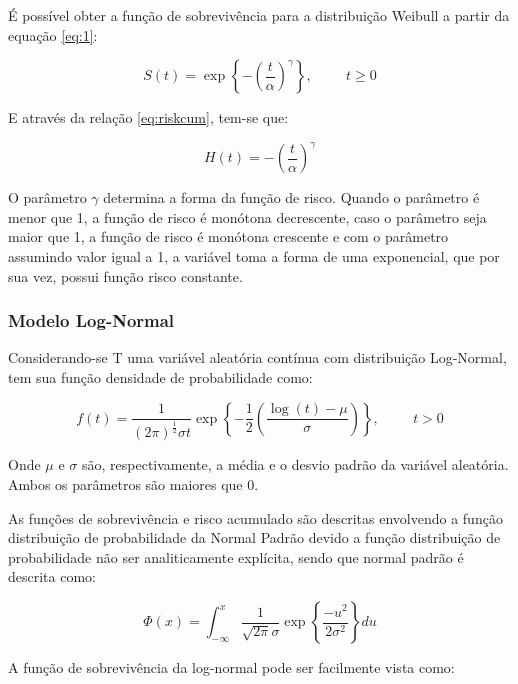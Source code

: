 \documentclass[a4paper,12pt]{article}
\begin{document}
É possível obter a função de sobrevivência para a distribuição Weibull a partir da equação \ref{eq:1}:

\begin{equation} \label{eq:WeiHaz}
S(t) = \exp \left\lbrace - \left( \dfrac{t}{\alpha} \right)^{\gamma} \right\rbrace, \hspace{1cm} t \ge 0
\end{equation}

E através da relação \ref{eq:riskcum}, tem-se que:

\begin{equation} \label{eq:WeRis}
	H(t) = - \left( \dfrac{t}{\alpha} \right)^{\gamma}
\end{equation}

O parâmetro $\gamma$ determina a forma da função de risco. Quando o parâmetro é menor que 1, a função de risco é monótona decrescente, caso o parâmetro seja maior que 1, a função de risco é monótona crescente e com o parâmetro assumindo valor igual a 1, a variável toma a forma de uma exponencial, que por sua vez, possui função risco constante.

\subsubsection{Modelo Log-Normal}

Considerando-se T uma variável aleatória contínua com distribuição Log-Normal, tem sua função densidade de probabilidade como:

\begin{equation}
 f(t) = \dfrac{1}{(2\pi)^{\frac{1}{2}}\sigma t}\exp\left\lbrace -\dfrac{1}{2} \left( \dfrac{\log(t) - \mu}{\sigma} \right) \right\rbrace, \hspace{1cm} t > 0
\end{equation}

Onde $\mu$ e $\sigma$ são, respectivamente, a média e o desvio padrão da variável aleatória. Ambos os parâmetros são maiores que 0.

As funções de sobrevivência e risco acumulado são descritas envolvendo a função distribuição de probabilidade da Normal Padrão devido a função distribuição de probabilidade não ser analiticamente explícita, sendo que normal padrão é descrita como:

$$ \Phi(x) =  \int_{-\infty}^{x} \dfrac{1}{\sqrt{2\pi}\sigma} \exp \left\lbrace \dfrac{-u^2}{2\sigma^2} \right\rbrace du $$

A função de sobrevivência da log-normal pode ser facilmente vista como:
\end{document}
